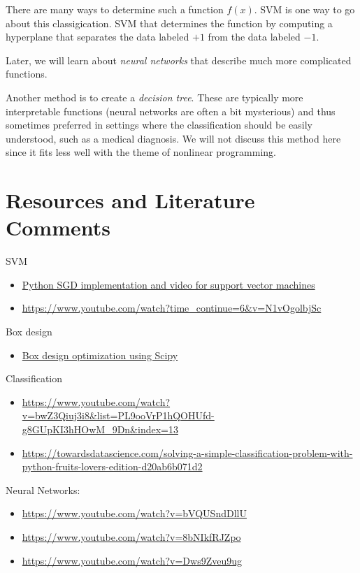 There are many ways to determine such a function $f(x)$.  SVM is one way to go about this classigication. SVM that determines the function by computing a hyperplane that separates the data labeled $+1$ from the data labeled $-1$.

Later, we will learn about \emph{neural networks} that describe much more complicated functions.  

Another method is to create a \emph{decision tree}.  These are typically more interpretable functions (neural networks are often a bit mysterious) and thus sometimes preferred in settings where the classification should be easily understood, such as a medical diagnosis.  We will not discuss this method here since it fits less well with the theme of nonlinear programming.

\section{Resources and Literature Comments}

\begin{resource}
SVM
\begin{itemize}
\item \href{https://github.com/llSourcell/Classifying_Data_Using_a_Support_Vector_Machine/blob/master/support_vector_machine_lesson.ipynb}{Python SGD implementation and video for support vector machines}
\item
\url{https://www.youtube.com/watch?time_continue=6&v=N1vOgolbjSc}
\end{itemize}
Box design
\begin{itemize}
\item \href{https://www.youtube.com/watch?v=iSnTtV6b0Gw}{Box design optimization using Scipy}
\end{itemize}
Classification
\begin{itemize}
\item \url{https://www.youtube.com/watch?v=bwZ3Qiuj3i8&list=PL9ooVrP1hQOHUfd-g8GUpKI3hHOwM_9Dn&index=13}
\item \url{https://towardsdatascience.com/solving-a-simple-classification-problem-with-python-fruits-lovers-edition-d20ab6b071d2}
\end{itemize}

Neural Networks:
\begin{itemize}
\item \url{https://www.youtube.com/watch?v=bVQUSndDllU}
\item \url{https://www.youtube.com/watch?v=8bNIkfRJZpo}
\item \url{https://www.youtube.com/watch?v=Dws9Zveu9ug}
\end{itemize}
\end{resource}


